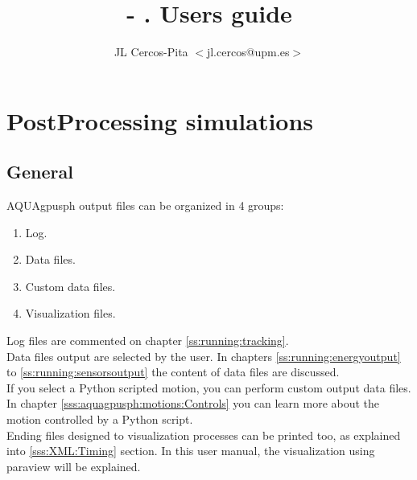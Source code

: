 \documentclass[a4paper,12pt]{book}
\author{JL Cercos-Pita $<$jl.cercos@upm.es$>$}
\title{\vspace{-2em}
\NAME- \VERSION.\rcc
\textbf{Users guide}}
\date{\today\\[4.0 in]
\begin{figure}[h!]
  \centering
  \texttt{[image: CC\_88x31]}
\end{figure}
}
\newcommand{\NAME}{AQUAgpusph }
\newcommand{\rc}{\\[0.2 in]}
\begin{document}
\maketitle
\thispagestyle{empty}
%
\newpage
\tableofcontents
\newpage
\newpage









\chapter{PostProcessing simulations}
\label{s:outputFiles}
%
\section{General}
%
\NAME output files can be organized in 4 groups:
%
\begin{enumerate}
	\item Log.
	\item Data files.
	\item Custom data files.
	\item Visualization files.
\end{enumerate}
%
Log files are commented on chapter \ref{ss:running:tracking}.\rc
%
Data files output are selected by the user. In chapters \ref{ss:running:energyoutput} to
\ref{ss:running:sensorsoutput} the content of data files are discussed.\rc
%
If you select a Python scripted motion, you can perform custom output data files. In chapter
\ref{sss:aquagpusph:motions:Controls} you can learn more about the motion controlled by a Python
script.\rc
%
Ending files designed to visualization processes can be printed too, as explained into \ref{sss:XML:Timing}
section. In this user manual, the visualization using paraview will be explained.
%







\begin{appendices}

\end{appendices}


\end{document}
